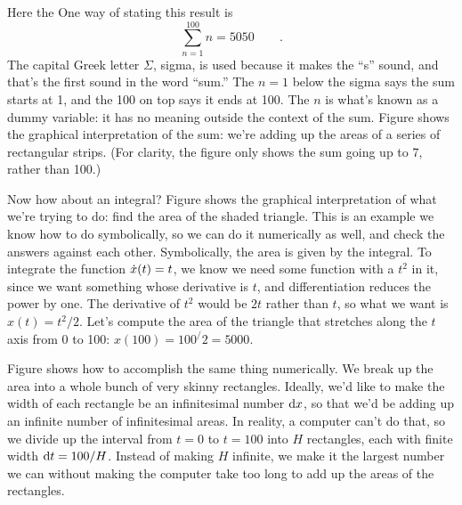 \begin{Code}
  \ii %
\end{Code}

Here the \verb@%@ symbol is the computer's prompt. The result is 5,050, as expected.
One way of stating this result is
\begin{equation*}
  \sum_{n=1}^{100} n = 5050 \qquad .
\end{equation*}
The capital Greek letter $\Sigma$, sigma, is used because it makes the ``s'' sound, and
that's the first sound in the word ``sum.'' The $n=1$ below the sigma says the sum starts
at 1, and the 100 on top says it ends at 100. The $n$ is what's known as a dummy variable:
it has no meaning outside the context of the sum. Figure  shows the
graphical interpretation of the sum: we're adding up the areas of a series of rectangular
strips. (For clarity, the figure only shows the sum going up to 7, rather than 100.)


Now how about an integral? Figure  shows the graphical interpretation
of what we're trying to do: find the area of the shaded triangle.
This is an example we know how to do symbolically, so we can do it numerically as well,
and check the answers against each other. Symbolically, the area is given by the integral.
To integrate the function $\dot{x}(t)=t$, we know we need some function with a $t^2$ in it,
since we want something whose derivative is $t$, and differentiation reduces the power
by one. The derivative of $t^2$ would be $2t$ rather than $t$, so what we want is
$x(t)=t^2/2$. Let's compute the area of the triangle that stretches along the $t$ axis
from 0 to 100: $x(100)=100^/2=5000$.


Figure  shows how to accomplish the same thing numerically. We break up the area
into a whole bunch of very skinny rectangles. Ideally, we'd like to make the width of each
rectangle be an infinitesimal number $\textup{d} x$, so that we'd be adding up an infinite number of
infinitesimal areas. In reality, a computer can't do that, so we divide up the interval from
$t=0$ to $t=100$ into $H$ rectangles, each with finite width $\textup{d} t=100/H$. Instead of making
$H$ infinite, we make it the largest number we can without making the computer take too
long to add up the areas of the rectangles.

